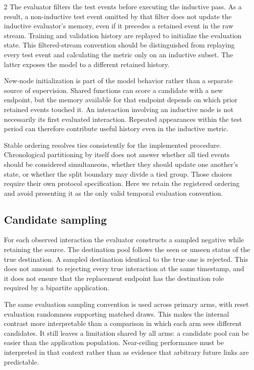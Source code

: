 \documentclass[a4paper,10pt]{article}
\begin{document}
\begin{multicols}{2}
The evaluator filters the test events before executing the inductive pass. As a result, a non-inductive test event omitted by that filter does not update the inductive evaluator's memory, even if it precedes a retained event in the raw stream. Training and validation history are replayed to initialize the evaluation state. This filtered-stream convention should be distinguished from replaying every test event and calculating the metric only on an inductive subset. The latter exposes the model to a different retained history.

New-node initialization is part of the model behavior rather than a separate source of supervision. Shared functions can score a candidate with a new endpoint, but the memory available for that endpoint depends on which prior retained events touched it. An interaction involving an inductive node is not necessarily its first evaluated interaction. Repeated appearances within the test period can therefore contribute useful history even in the inductive metric.

Stable ordering resolves ties consistently for the implemented procedure. Chronological partitioning by itself does not answer whether all tied events should be considered simultaneous, whether they should update one another's state, or whether the split boundary may divide a tied group. Those choices require their own protocol specification. Here we retain the registered ordering and avoid presenting it as the only valid temporal evaluation convention.

\subsection{Candidate sampling}
For each observed interaction the evaluator constructs a sampled negative while retaining the source. The destination pool follows the seen or unseen status of the true destination. A sampled destination identical to the true one is rejected. This does not amount to rejecting every true interaction at the same timestamp, and it does not ensure that the replacement endpoint has the destination role required by a bipartite application.

The same evaluation sampling convention is used across primary arms, with reset evaluation randomness supporting matched draws. This makes the internal contrast more interpretable than a comparison in which each arm sees different candidates. It still leaves a limitation shared by all arms: a candidate pool can be easier than the application population. Near-ceiling performance must be interpreted in that context rather than as evidence that arbitrary future links are predictable.


\end{multicols}
\end{document}
